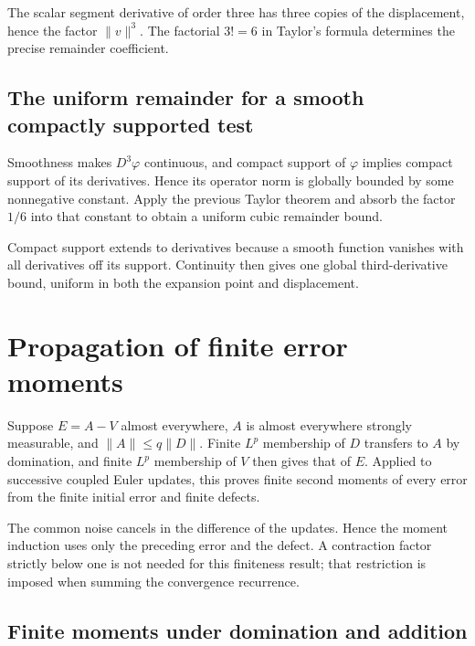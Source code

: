 \documentclass[11pt,a4paper]{report}
\begin{document}
The scalar segment derivative of order three has three copies of the displacement, hence the factor \(\|v\|^3\). The factorial \(3!=6\) in Taylor's formula determines the precise remainder coefficient.

\subsection{\texorpdfstring{The uniform remainder for a smooth compactly supported test}{The uniform remainder for a smooth compactly supported test}}
\label{report-step-UnadjustedLangevin-WeakForwardTaylor-lean-3}


Smoothness makes \(D^3\varphi\) continuous, and compact support of \(\varphi\) implies compact support of its derivatives. Hence its operator norm is globally bounded by some nonnegative constant. Apply the previous Taylor theorem and absorb the factor \(1/6\) into that constant to obtain a uniform cubic remainder bound.



Compact support extends to derivatives because a smooth function vanishes with all derivatives off its support. Continuity then gives one global third-derivative bound, uniform in both the expansion point and displacement.

\section{\texorpdfstring{Propagation of finite error moments}{Propagation of finite error moments}}
\label{proof-module-UnadjustedLangevin-Integrability-lean}


Suppose \(E=A-V\) almost everywhere, \(A\) is almost everywhere strongly measurable, and \(\|A\|\le q\|D\|\). Finite \(L^p\) membership of \(D\) transfers to \(A\) by domination, and finite \(L^p\) membership of \(V\) then gives that of \(E\). Applied to successive coupled Euler updates, this proves finite second moments of every error from the finite initial error and finite defects.



The common noise cancels in the difference of the updates. Hence the moment induction uses only the preceding error and the defect. A contraction factor strictly below one is not needed for this finiteness result; that restriction is imposed when summing the convergence recurrence.

\subsection{\texorpdfstring{Finite moments under domination and addition}{Finite moments under domination and addition}}
\label{report-step-UnadjustedLangevin-Integrability-lean-1}
\end{document}
